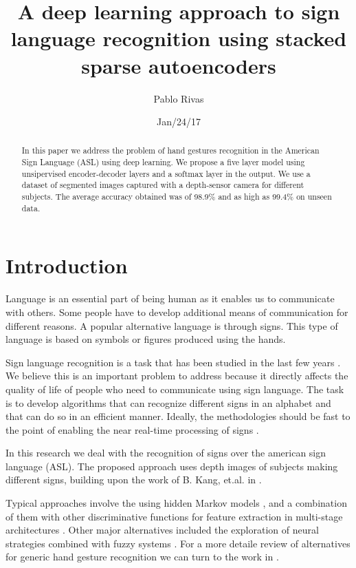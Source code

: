 \documentclass[a4paper]{article}
\title{A deep learning approach to sign language recognition using stacked
sparse autoencoders}
\author{Pablo Rivas}
\date{Jan/24/17}
\begin{document}
\lstset{language=Python}

\maketitle

\begin{abstract}
In this paper we address the problem of hand gestures recognition in the
American Sign Language (ASL) using deep learning. We propose a five layer model
using unsipervised encoder-decoder layers and a softmax layer in the output. We
use a dataset of segmented images captured with a depth-sensor camera for
different subjects. The average accuracy obtained was of 98.9\% and as high as
99.4\% on unseen data.
\end{abstract}

\section{Introduction}

Language is an essential part of being human as it enables us to communicate
with others. Some people have to develop additional means of communication
for different reasons. A popular alternative language is through signs. This
type of language is based on symbols or figures produced using the hands. 

Sign language recognition is a task that has been studied in the last few years
\cite{starner1998real}. We believe this is an important problem to address
because it directly affects the quality of life of people who need to
communicate using sign language. The task is to develop algorithms that can
recognize different signs in an alphabet and that can do so in an efficient
manner. Ideally, the methodologies should be fast to the point of enabling the 
near real-time processing of signs \cite{starner1997real}.

In this research we deal with the recognition of signs over the american sign
language (ASL). The proposed approach uses depth images of subjects making
different signs, building upon the work of B. Kang, et.al. in
\cite{kang2015real}. 

Typical approaches involve the using hidden Markov models
\cite{starner1997real}, and a combination of them with other discriminative
functions for feature extraction in multi-stage architectures
\cite{lichtenauer2008sign}. Other major alternatives included the exploration
of neural strategies combined with fuzzy systems \cite{al2001recognition}. For
a more detaile review of alternatives for generic hand gesture recognition we
can turn to the work in \cite{murthy2009review}.
\end{document}
